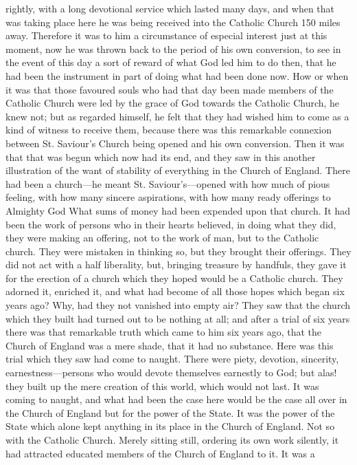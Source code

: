 rightly, with a long devotional service which lasted many days, and
when that was taking place here he was being received into the
Catholic Church 150 miles away. Therefore it was to him a circumstance
of especial interest just at this moment, now he was thrown back to
the period of his own conversion, to see in the event of this day a
sort of reward of what God led him to do then, that he had been the
instrument in part of doing what had been done now. How or when it was
that those favoured souls who had that day been made members of the
Catholic Church were led by the grace of God towards the Catholic
Church, he knew not; but as regarded himself, he felt that they had
wished him to come as a kind of witness to receive them, because there
was this remarkable connexion between St. Saviour's Church being
opened and his own conversion. Then it was that that was begun which
now had its end, and they saw in this another illustration of the want
of stability of everything in the Church of England. There had been a
church—he meant St. Saviour's—opened with how much of pious
feeling, with how many sincere aspirations, with how many ready
offerings to Almighty God What sums of money had been expended upon
that church. It had been the work of persons who in their hearts
believed, in doing what they did, they were making an offering, not to
the work of man, but to the Catholic church. They were mistaken in
thinking so, but they brought their offerings. They did not act with a
half liberality, but, bringing treasure by handfuls, they gave it for
the erection of a church which they hoped would be a Catholic church.
They adorned it, enriched it, and what had become of all those hopes
which began six years ago? Why, had they not vanished into empty air?
They saw that the church which they built had turned out to be nothing
at all; and after a trial of six years there was that remarkable truth
which came to him six years ago, that the Church of England was a
mere shade, that it had no substance. Here was this trial which they
saw had come to naught. There were piety, devotion, sincerity,
earnestness—persons who would devote themselves earnestly to God;
but alas! they built up the mere creation of this world, which would
not last. It was coming to naught, and what had been the case here
would be the case all over in the Church of England but for the power
of the State. It was the power of the State which alone kept anything
in its place in the Church of England. Not so with the Catholic
Church. Merely sitting still, ordering its own work silently, it had
attracted educated members of the Church of England to it. It was a
